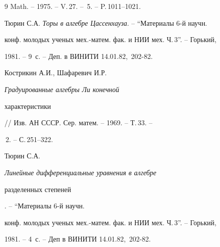 \begin{thebibliography}{9}
Math. -- 1975. -- V.\,27. -- \No\,5. -- P.\,1011--1021.




Тюрин С.А. {\em Торы в алгебре Цассенхауза}. -- ``Материалы 6-й научн.


конф. молодых ученых мех.-матем. фак. и НИИ мех. Ч.\,3''. -- Горький,


1981. -- 9~с. -- Деп. в ВИНИТИ 14.01.82, \No\,202-82.




Кострикин А.И., Шафаревич И.Р. {\em Градуированные алгебры Ли конечной


характеристики} // Изв. АН СССР. Сер. матем. -- 1969. -- Т.\,33. --


\No\,2. -- С.\,251--322.




Тюрин С.А. {\em Линейные дифференциальные уравнения в алгебре


разделенных степеней}. -- ``Материалы 6-й научн.


конф. молодых ученых мех.-матем. фак. и НИИ мех. Ч.\,3''. -- Горький,


1981. -- 4~с. -- Деп в ВИНИТИ 14.01.82, \No\,202-82.








\end{thebibliography}





\vskip 2cm















